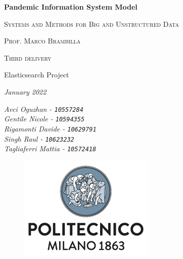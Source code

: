 \documentclass[12pt, a4paper]{article}
\begin{document}

\begin{titlepage}
  \centering
  {\Huge\bfseries Pandemic Information System Model\par} %
  \vspace{1.5cm}
  {\scshape\large Systems and Methods for Big and Unstructured Data \par} %
  \vspace{0.5cm}
  {\scshape\large Prof. Marco Brambilla \par} %
  \vspace{1cm}
  {\scshape\large %
      Third delivery \par 
      Elasticsearch Project \par 
  }
  \vspace{0.5cm}
  {\slshape\large January 2022 \par} %
  \vspace{1cm}
  \linespread{0.8} %
  {\large\itshape %
      Avci Oguzhan - \texttt{10557284}\\
      Gentile Nicole - \texttt{10594355}\\
      Rigamonti Davide - \texttt{10629791}\\
      Singh Raul - \texttt{10623232}\\
      Tagliaferri Mattia - \texttt{10572418}
  }
  \vfill
  \begin{figure}[b]
      \includegraphics[scale=0.6]{polimi.png} %
      \centering
  \end{figure}

\end{titlepage}


\clearpage

{
    \hypersetup{hidelinks}
    \tableofcontents
}
\end{document}
